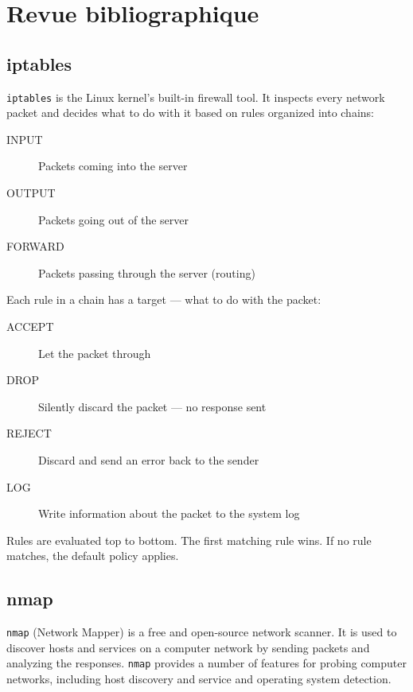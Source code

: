 \chapter{Revue bibliographique}
\section{iptables}
\texttt{iptables} is the Linux kernel’s built-in firewall tool. It inspects every network packet and decides what to do with it based on rules organized into chains:
\begin{description}
    \item[INPUT] Packets coming into the server
    \item[OUTPUT] Packets going out of the server
    \item[FORWARD] Packets passing through the server (routing)
\end{description}
Each rule in a chain has a target — what to do with the packet:
\begin{description}
    \item[ACCEPT] Let the packet through
    \item[DROP] Silently discard the packet — no response sent
    \item[REJECT] Discard and send an error back to the sender
    \item[LOG] Write information about the packet to the system log
\end{description}
Rules are evaluated top to bottom. The first matching rule wins. If no rule matches, the default policy applies.
\lipsum[3-5]

\section{nmap}
\texttt{nmap} (Network Mapper) is a free and open-source network scanner. It is used to discover hosts and services on a computer network by sending packets and analyzing the responses. \texttt{nmap} provides a number of features for probing computer networks, including host discovery and service and operating system detection.
\lipsum[6-7]
